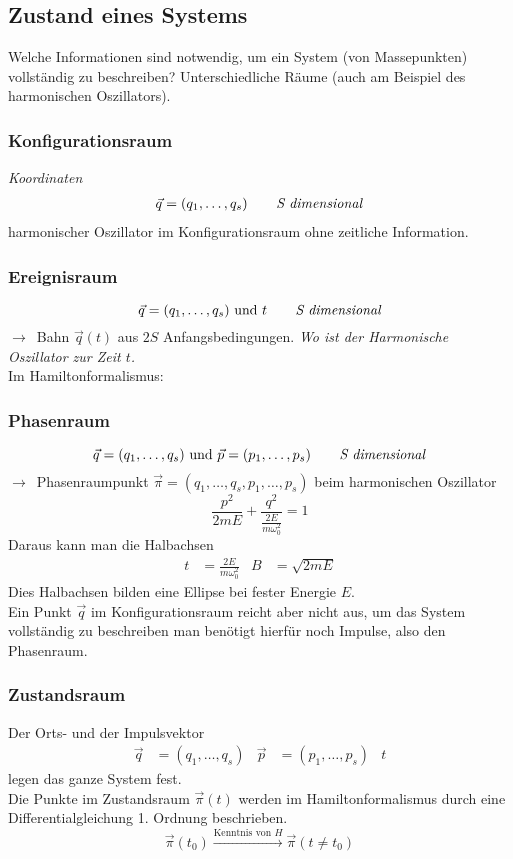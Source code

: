 \documentclass[oneside]{book}
\theoremstyle{definition}
\newcommand{\conseq}{$\rightarrow$~}
\begin{document}
\subsection{Zustand eines Systems}
Welche Informationen sind notwendig, um ein System (von Massepunkten) vollständig zu beschreiben?
Unterschiedliche Räume (auch am Beispiel des harmonischen Oszillators).
\subsubsection{Konfigurationsraum} \textit{Koordinaten}
\begin{align*}
	\vec{q} = (q_1, \dots, q_s) \text{\textit{\qquad S dimensional}}
\end{align*}
harmonischer Oszillator im Konfigurationsraum ohne zeitliche Information.

\subsubsection{Ereignisraum}
$$\vec{q} = (q_1, \dots, q_s) \text{~und~} t \text{\textit{\qquad S dimensional}}$$
\conseq Bahn $\vec{q}(t)$ aus $2S$ Anfangsbedingungen. \textit{Wo ist der Harmonische Oszillator zur Zeit $t$.}\\

Im Hamiltonformalismus:

\subsubsection{Phasenraum}
$$\vec{q} = (q_1, \dots, q_s) \text{~und~} \vec{p} = (p_1, \dots, p_s) \text{\textit{\qquad S dimensional}}$$
\conseq Phasenraumpunkt $\vec{\pi} = (q_1, \dots, q_s, p_1, \dots, p_s)$
beim harmonischen Oszillator
$$\frac{p^2}{2 m E} + \frac{q^2}{\frac{2 E}{m \omega_0^2}} = 1$$
Daraus kann man die Halbachsen 
\begin{align*}
t &= \frac{2 E}{m \omega_0^2}  &   B &= \sqrt{2 m E}
\end{align*}
Dies Halbachsen bilden eine Ellipse bei fester Energie $E$.\\
Ein Punkt $\vec{q}$ im Konfigurationsraum reicht aber nicht aus, um das System vollständig zu beschreiben man benötigt hierfür noch Impulse, also den Phasenraum.

\subsubsection{Zustandsraum}
Der Orts- und der Impulsvektor
\begin{align*}
	\vec{q} &= (q_1, \dots, q_s) & \vec{p} &= (p_1, \dots, p_s) & t
\end{align*}
legen das ganze System fest.\\
Die Punkte im Zustandsraum $\vec{\pi} (t)$ werden im Hamiltonformalismus durch eine Differentialgleichung 1. Ordnung beschrieben.
$$\vec{\pi}(t_0) \xrightarrow{\text{Kenntnis von $H$}} \vec{\pi}(t \neq t_0)$$
\end{document}
